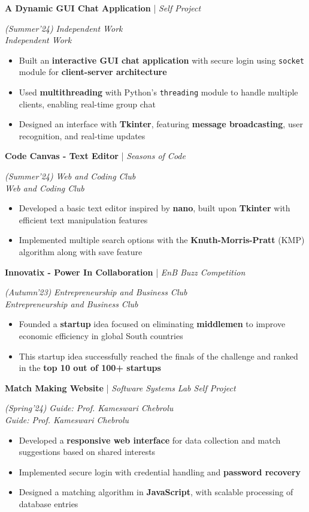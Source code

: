 \documentclass[10pt]{article}
\renewcommand{\subsection}[4]{
	\def\temp{#4}
	\vspace{2pt}
	{
		\large
		{\color{Green} \textbf{#1}} | {\sl #2} \filldate{#3}
		\ifx\temp\empty
		\else
		{
			\\[0.098em]
			\fontsize{10.5}{13.2}\selectfont
			\sl #4
		}
		\fi
	}
}
\newcommand{\filldate}[1]{\strut\hfill {\small \textit{(#1)}}}
\begin{document}
\subsection{A Dynamic GUI Chat Application}{Self Project}{Summer'24}{\textit{Independent Work}}  
\begin{itemize}
    \item Built an \textbf{interactive GUI chat application} with secure login using \texttt{socket} module for \textbf{client-server architecture}
    \item Used \textbf{multithreading} with Python's \texttt{threading} module to handle multiple clients, enabling real-time group chat
    \item Designed an interface with \textbf{Tkinter}, featuring \textbf{message broadcasting}, user recognition, and real-time updates 
\end{itemize}

\subsection{Code Canvas - Text Editor}{Seasons of Code}{Summer'24}{\textit{Web and Coding Club}}  
\begin{itemize}
    \item Developed a basic text editor inspired by \textbf{nano}, built upon \textbf{Tkinter} with efficient text manipulation features
    \item Implemented multiple search options with the \textbf{Knuth-Morris-Pratt} (KMP) algorithm along with save feature
\end{itemize}

\subsection{Innovatix - Power In Collaboration}{EnB Buzz Competition}{Autumn'23}{\textit{Entrepreneurship and Business Club}}  
\begin{itemize}
    \item Founded a \textbf{startup} idea focused on eliminating \textbf{middlemen} to improve economic efficiency in global South countries 
    \item This startup idea successfully reached the finals of the challenge and ranked in the \textbf{top 10 out of 100+ startups}
\end{itemize}

\subsection{Match Making Website}{Software Systems Lab Self Project}{Spring'24}{\textit{Guide: Prof. Kameswari Chebrolu}}  
\begin{itemize}
    \item Developed a \textbf{responsive web interface} for data collection and match suggestions based on shared interests  
    \item Implemented secure login with credential handling and \textbf{password recovery}  
    \item Designed a matching algorithm in \textbf{JavaScript}, with scalable processing of database entries  
\end{itemize}
\end{document}
